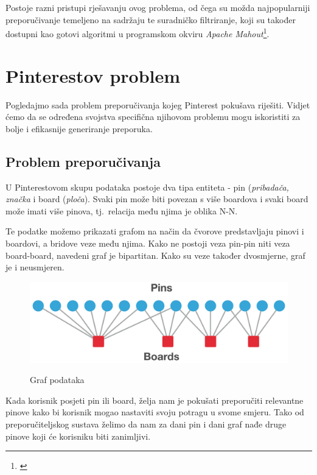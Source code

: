 \documentclass[times, utf8, seminar]{fer}
\begin{document}
Postoje razni pristupi rješavanju ovog problema, od čega su možda najpopularniji preporučivanje temeljeno na sadržaju te suradničko filtriranje, koji su također dostupni kao gotovi algoritmi u programskom okviru \textit{Apache Mahout}\footnote{\cite{rovkp-mahout}}.

\section{Pinterestov problem}

Pogledajmo sada problem preporučivanja kojeg Pinterest pokušava riješiti. Vidjet ćemo da se određena svojstva specifična njihovom problemu mogu iskoristiti za bolje i efikasnije generiranje preporuka.

\subsection{Problem preporučivanja}

U Pinterestovom skupu podataka postoje dva tipa entiteta - pin (\textit{pribadača, značka} i board (\textit{ploča}). Svaki pin može biti povezan s više boardova i svaki board može imati više pinova, tj.\ relacija među njima je oblika N-N.

Te podatke možemo prikazati grafom na način da čvorove predstavljaju pinovi i boardovi, a bridove veze među njima. Kako ne postoji veza pin-pin niti veza board-board, navedeni graf je bipartitan. Kako su veze također dvosmjerne, graf je i neusmjeren.

\begin{figure}[h]
	\centering
	\includegraphics[width=\textwidth]{pins_boards_graph}
	\caption{Graf podataka}
	\cite{medium-article}
	\label{fig:pins_boards}
\end{figure}

Kada korisnik posjeti pin ili board, želja nam je pokušati preporučiti relevantne pinove kako bi korisnik mogao nastaviti svoju potragu u svome smjeru. Tako od preporučiteljskog sustava želimo da nam za dani pin i dani graf nađe druge pinove koji će korisniku biti zanimljivi.
\end{document}
